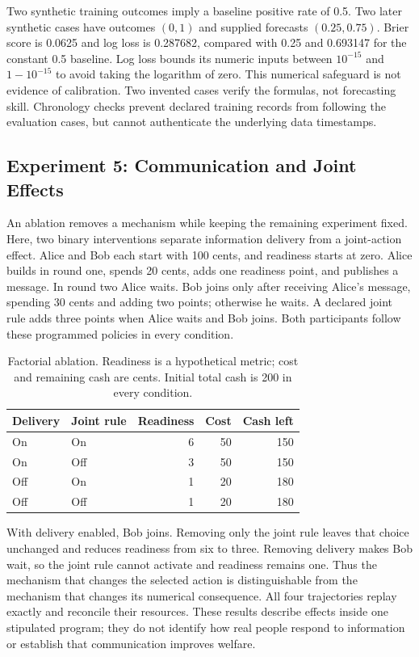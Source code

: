 Two synthetic training outcomes imply a baseline positive rate of 0.5.
Two later synthetic cases have outcomes $(0,1)$ and supplied forecasts
$(0.25,0.75)$. Brier score is 0.0625 and log loss is 0.287682, compared with
0.25 and 0.693147 for the constant 0.5 baseline. Log loss bounds its numeric
inputs between $10^{-15}$ and $1-10^{-15}$ to avoid taking the logarithm of
zero. This numerical safeguard is not evidence of calibration. Two invented
cases verify the formulas, not forecasting skill. Chronology checks prevent
declared training records from following the evaluation cases, but cannot
authenticate the underlying data timestamps.

\subsection{Experiment 5: Communication and Joint Effects}\label{sec:ablation}
An ablation removes a mechanism while keeping the remaining experiment fixed.
Here, two binary interventions separate information delivery from a joint-action
effect. Alice and Bob each start with 100 cents, and readiness starts at zero.
Alice builds in round one, spends 20 cents, adds one readiness point, and
publishes a message. In round two Alice waits. Bob joins only after receiving
Alice's message, spending 30 cents and adding two points; otherwise he waits.
A declared joint rule adds three points when Alice waits and Bob joins.
Both participants follow these programmed policies in every condition.

\begin{table}[t]
\caption{Factorial ablation. Readiness is a hypothetical metric; cost and
remaining cash are cents. Initial total cash is 200 in every condition.}
\label{tab:ablation}
\centering\footnotesize
\begin{tabular}{@{}llrrr@{}}
\toprule Delivery & Joint rule & Readiness & Cost & Cash left \\
\midrule
On & On & 6 & 50 & 150 \\
On & Off & 3 & 50 & 150 \\
Off & On & 1 & 20 & 180 \\
Off & Off & 1 & 20 & 180 \\
\bottomrule
\end{tabular}
\end{table}

With delivery enabled, Bob joins. Removing only the joint rule leaves that
choice unchanged and reduces readiness from six to three. Removing delivery
makes Bob wait, so the joint rule cannot activate and readiness remains one.
Thus the mechanism that changes the selected action is distinguishable from
the mechanism that changes its numerical consequence. All four trajectories
replay exactly and reconcile their resources. These results describe effects
inside one stipulated program; they do not identify how real people respond
to information or establish that communication improves welfare.

